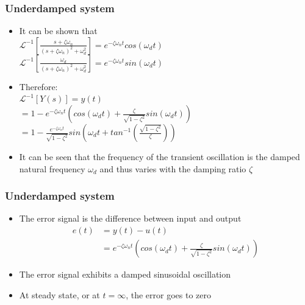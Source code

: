 \begin{frame}
\frametitle{Underdamped system}
\begin{itemize}
\item It can be shown that
\\ $\mathcal{L}^{-1}[\frac{s+\zeta\omega_n}{(s+\zeta\omega_n)^2+\omega_d ^2}]= e^{-\zeta\omega_n t}cos(\omega_d t)$\\ 
$\mathcal{L}^{-1}[\frac{\omega_d}{(s+\zeta\omega_n)^2+\omega_d ^2}]= e^{-\zeta\omega_n t}sin(\omega_d t)$
\item Therefore:\\
$\mathcal{L}^{-1}[Y(s)]=y(t)$\\$ = 1 - e^{-\zeta\omega_n t}(cos(\omega_d t)+\frac{\zeta}{\sqrt{1 - \zeta^2}}sin(\omega_d t))$\\$ = 1 - \frac{e^{-\zeta\omega_n t}}{\sqrt{1-\zeta^2}}sin(\omega_d t+ tan^{-1}(\frac{\sqrt{1-\zeta^2}}{\zeta}))$
\item It can be seen that the frequency of the transient oscillation is the damped natural frequency $\omega_d$ and thus varies with the damping ratio $\zeta$
\end{itemize}
\end{frame}

\begin{frame}
\frametitle{Underdamped system}
\begin{itemize}
\item The error signal is the difference between input and output
\begin{align*}
e(t)&= y(t) -u(t)
\\&= e^{-\zeta\omega_n t}(cos(\omega_d t)+\frac{\zeta}{\sqrt{1 - \zeta^2}}sin(\omega_d t))
\end{align*}
\item The error signal exhibits a damped sinusoidal oscillation
\item At steady state, or at $t=\infty$, the error goes to zero
\end{itemize}
\end{frame}

